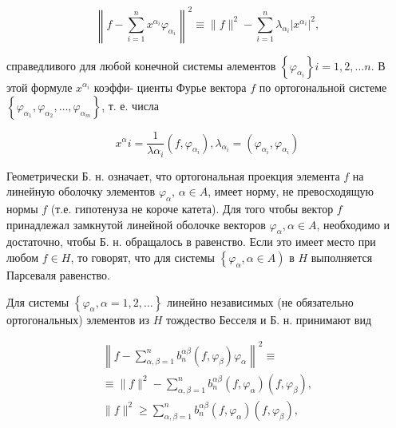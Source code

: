 \documentclass[10pt]{article}
\begin{document}
\[

\left\|f-\sum_{i=1}^{n} x^{\alpha_{i}} \varphi_{\alpha_{i}}\right\|^{2} \equiv\|f\|^{2}-\sum_{i=1}^{n} \lambda_{\alpha_{i}}\left|x^{\alpha_{i}}\right|^{2},

\]



справедливого для любой конечной системы әлементов $\left\{\varphi_{\alpha_{i}}\right\} i=1,2, \ldots n$. В этой формуле $x^{\alpha_{i}}$ коэффи- циенты Фурье вектора $f$ по ортогональной системе $\left\{\varphi_{\alpha_{1}}, \varphi_{\alpha_{2}}, \ldots, \varphi_{\alpha_{m}}\right\}$, т. е. числа



\[

x^{\alpha} i=\frac{1}{\lambda \alpha_{i}}\left(f, \varphi_{\alpha_{i}}\right), \lambda_{\alpha_{i}}=\left(\varphi_{\alpha_{i}}, \varphi_{\alpha_{i}}\right)

\]



Геометрически Б. н. означает, что ортогональная проекция элемента $f$ на линейную оболочку элементов $\varphi_{\alpha}$, $\alpha \in A$, имеет норму, не превосходящую нормы $f$ (т.е. гипотенуза не короче катета). Для того чтобы вектор $f$ принадлежал замкнутой линейной оболочке векторов $\varphi_{\alpha}, \alpha \in A$, необходимо и достаточно, чтобы Б. н. обращалось в равенство. Если это имеет место при любом $f \in H$, то говорят, что для системы $\left\{\varphi_{\alpha}, \alpha \in A\right)$ в $H$ выполняется Парсеваля равенство.



Для системы $\left\{\varphi_{\alpha}, \alpha=1,2, \ldots\right\}$ линейно независимых (не обязательно ортогональных) элементов из $H$ тождество Бесселя и Б. н. принимают вид



\[

\begin{gathered}

\left\|f-\sum_{\alpha, \beta=1}^{n} b_{n}^{\alpha \beta}\left(f, \varphi_{\beta}\right) \varphi_{\alpha}\right\|^{2} \equiv \\

\equiv\|f\|^{2}-\sum_{\alpha, \beta=1}^{n} b_{n}^{\alpha \beta}\left(f, \varphi_{\alpha}\right)\left(f, \varphi_{\beta}\right), \\

\|f\|^{2} \geqslant \sum_{\alpha, \beta=1}^{n} b_{n}^{\alpha \beta}\left(f, \varphi_{\alpha}\right)\left(f, \varphi_{\beta}\right),

\end{gathered}

\]
\end{document}
